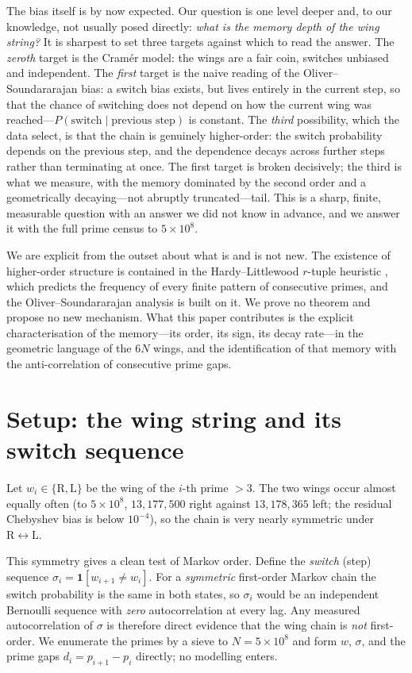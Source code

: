 \documentclass[11pt]{article}
\theoremstyle{definition}
\begin{document}
The bias itself is by now expected. Our question is one level deeper and, to our knowledge, not usually
posed directly: \emph{what is the memory depth of the wing string?} It is sharpest to set three targets
against which to read the answer. The \emph{zeroth} target is the Cram\'er model: the wings are a fair
coin, switches unbiased and independent. The \emph{first} target is the naive reading of the
Oliver--Soundararajan bias: a switch bias exists, but lives entirely in the current step, so that the
chance of switching does not depend on how the current wing was reached---$P(\text{switch}\mid\text{previous step})$
is constant. The \emph{third} possibility, which the data select, is that the chain is genuinely
higher-order: the switch probability depends on the previous step, and the dependence decays across
further steps rather than terminating at once. The first target is broken decisively; the third is what
we measure, with the memory dominated by the second order and a geometrically decaying---not abruptly
truncated---tail. This is a sharp, finite, measurable question with an answer we did not know in
advance, and we answer it with the full prime census to $5\times10^{8}$.

We are explicit from the outset about what is and is not new. The existence of higher-order structure is
contained in the Hardy--Littlewood $r$-tuple heuristic \cite{HL}, which predicts the frequency of every
finite pattern of consecutive primes, and the Oliver--Soundararajan analysis \cite{OS} is built on it.
We prove no theorem and propose no new mechanism. What this paper contributes is the explicit
characterisation of the memory---its order, its sign, its decay rate---in the geometric language of the
$6N$ wings, and the identification of that memory with the anti-correlation of consecutive prime gaps.

\section{Setup: the wing string and its switch sequence}
Let $w_i\in\{\mathrm{R},\mathrm{L}\}$ be the wing of the $i$-th prime $>3$. The two wings occur almost
equally often (to $5\times10^{8}$, $13{,}177{,}500$ right against $13{,}178{,}365$ left; the residual
Chebyshev bias is below $10^{-4}$), so the chain is very nearly symmetric under $\mathrm{R}\!\leftrightarrow\!\mathrm{L}$.

This symmetry gives a clean test of Markov order. Define the \emph{switch} (step) sequence
$\sigma_i=\mathbf{1}[w_{i+1}\ne w_i]$. For a \emph{symmetric} first-order Markov chain the switch
probability is the same in both states, so $\sigma_i$ would be an independent Bernoulli sequence with
\emph{zero} autocorrelation at every lag. Any measured autocorrelation of $\sigma$ is therefore direct
evidence that the wing chain is \emph{not} first-order. We enumerate the primes by a sieve to
$N=5\times10^{8}$ and form $w$, $\sigma$, and the prime gaps $d_i=p_{i+1}-p_i$ directly; no modelling
enters.
\end{document}
